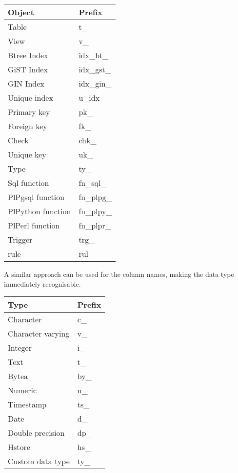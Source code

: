 \begin{table}[H]
\begin{tabular}{ll}
 \textbf{Object} & \textbf{Prefix}  \\
 \hline
 Table & t\_ \\
 View & v\_ \\
Btree Index & idx\_bt\_ \\
GiST Index & idx\_gst\_ \\
GIN Index & idx\_gin\_ \\
Unique index & u\_idx\_ \\
Primary key & pk\_ \\
Foreign key & fk\_ \\
Check & chk\_ \\
Unique key & uk\_ \\
Type & ty\_ \\
Sql function & fn\_sql\_ \\
PlPgsql function & fn\_plpg\_ \\
PlPython function & fn\_plpy\_ \\
PlPerl function & fn\_plpr\_ \\
Trigger & trg\_ \\
rule & rul\_ \\

\end{tabular}
\end{table}

A similar approach can be used for the column names, making the data type immediately recognisable.

\begin{table}[H]
\begin{tabular}{ll}
 \textbf{Type} & \textbf{Prefix}  \\
 \hline
 Character & c\_ \\
 Character varying & v\_ \\
Integer & i\_ \\
Text & t\_ \\
Bytea & by\_ \\
Numeric & n\_ \\
Timestamp & ts\_ \\
Date & d\_ \\
Double precision & dp\_ \\
Hstore & hs\_ \\
Custom data type & ty\_ \\

\end{tabular}
\end{table}



